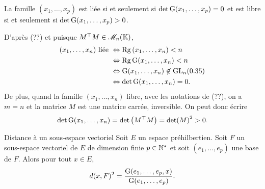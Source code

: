 \begin{prop}{}
     La famille $(x_1, \dots, x_p)$ est liée si et seulement si $\det \mathrm{G}(x_1, \dots, x_p) = 0$ et est libre si et seulement si $\det \mathrm{G}(x_1, \dots, x_p) > 0$.
\end{prop}

\begin{preuve}
    D'après (??) et puisque $M^\top M \in \mathscr{M}_n(\mathbb{K})$,
    \begin{align*}
        (x_1, \dots, x_n) \text{ liée } &\Leftrightarrow \mathrm{Rg}\, (x_1, \dots, x_n) < n \\
        &\Leftrightarrow \mathrm{Rg}\, \mathrm{G}(x_1, \dots, x_n) < n \\
        &\Leftrightarrow \mathrm{G}(x_1, \dots, x_n) \not \in \mathrm{GL}_n(0.35) \\
        &\Leftrightarrow \det \mathrm{G}(x_1, \dots, x_n) = 0.
    \end{align*}
    De plus, quand la famille $(x_1, \dots, x_n)$ libre, avec les notations de (??), on a $m=n$ et la matrice $M$ est une matrice carrée, inversible. On peut donc écrire
    $$\det \mathrm{G}(x_1, \dots, x_n) = \det \big( M^\top M \big) = \det(M)^2 > 0.$$
\end{preuve}

\begin{theo}{Distance à un sous-espace vectoriel} 
    Soit $E$ un espace préhilbertien. Soit $F$ un sous-espace vectoriel de $E$ de dimension finie $p \in \mathbb{N}^\star$ et soit $(e_1, \dots, e_p)$ une base de $F$. Alors pour tout $x \in E$,
    $$d(x, F)^2 = \frac{\mathrm{G}(e_1, \dots, e_p, x)}{\mathrm{G}(e_1, \dots, e_p)}.$$
\end{theo}

